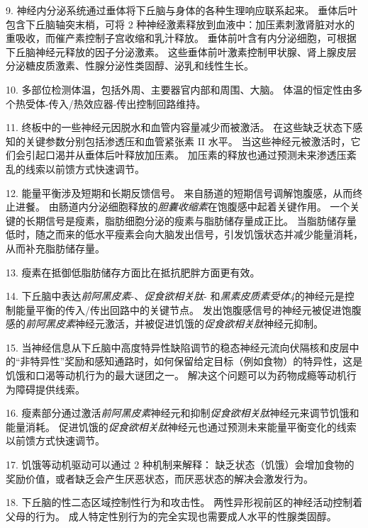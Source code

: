 9. 神经内分泌系统通过垂体将下丘脑与身体的各种生理响应联系起来。
垂体后叶包含下丘脑轴突末梢，可将 2 种神经激素释放到血液中：加压素刺激肾脏对水的重吸收，而催产素控制子宫收缩和乳汁释放。
垂体前叶含有内分泌细胞，可根据下丘脑神经元释放的因子分泌激素。
这些垂体前叶激素控制甲状腺、肾上腺皮层分泌糖皮质激素、性腺分泌性类固醇、泌乳和线性生长。


10. 多部位检测体温，包括外周、主要器官内部和周围、大脑。
体温的恒定性由多个热受体-传入/热效应器-传出控制回路维持。


11. 终板中的一些神经元因脱水和血管内容量减少而被激活。
在这些缺乏状态下感知的关键参数分别包括渗透压和血管紧张素 II 水平。
当这些神经元被激活时，它们会引起口渴并从垂体后叶释放加压素。
加压素的释放也通过预测未来渗透压紊乱的线索以前馈方式快速调节。 


12. 能量平衡涉及短期和长期反馈信号。
来自肠道的短期信号调解饱腹感，从而终止进餐。
由肠道内分泌细胞释放的\textit{胆囊收缩素}在饱腹感中起着关键作用。
一个关键的长期信号是瘦素，脂肪细胞分泌的瘦素与脂肪储存量成正比。
当脂肪储存量低时，随之而来的低水平瘦素会向大脑发出信号，引发饥饿状态并减少能量消耗，从而补充脂肪储存量。 


13. 瘦素在抵御低脂肪储存方面比在抵抗肥胖方面更有效。 


14. 下丘脑中表达\textit{前阿黑皮素}-、\textit{促食欲相关肽}- 和\textit{黑素皮质素受体4}的神经元是控制能量平衡的传入/传出回路中的关键节点。
发出饱腹感信号的神经元被促进饱腹感的\textit{前阿黑皮素}神经元激活，并被促进饥饿的\textit{促食欲相关肽}神经元抑制。


15. 当神经信息从下丘脑中高度特异性缺陷调节的稳态神经元流向伏隔核和皮层中的“非特异性”奖励和感知通路时，如何保留给定目标（例如食物）的特异性，这是饥饿和口渴等动机行为的最大谜团之一。
解决这个问题可以为药物成瘾等动机行为障碍提供线索。 


16. 瘦素部分通过激活\textit{前阿黑皮素}神经元和抑制\textit{促食欲相关肽}神经元来调节饥饿和能量消耗。
促进饥饿的\textit{促食欲相关肽}神经元也通过预测未来能量平衡变化的线索以前馈方式快速调节。


17. 饥饿等动机驱动可以通过 2 种机制来解释：
缺乏状态（饥饿）会增加食物的奖励价值，或者缺乏会产生厌恶状态，而厌恶状态的解决会激发行为。 


18. 下丘脑的性二态区域控制性行为和攻击性。
两性异形视前区的神经活动控制着父母的行为。
成人特定性别行为的完全实现也需要成人水平的性腺类固醇。

